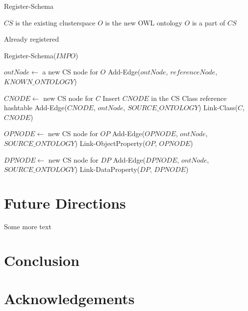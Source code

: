 \documentclass{sig-alternate}
\begin{document}
    \begin{algorithm}
        \caption{Register-Schema}
        \label{csf}
        \begin{algorithmic}
            \REQUIRE $CS$ is the existing clusterspace
            \REQUIRE $O$ is the new OWL ontology
            \ENSURE $O$ is a part of $CS$

                \RETURN Already registered
            \ENDIF

                \STATE Register-Schema($IMPO$)
            \ENDFOR

            \STATE $ontNode \leftarrow$ a new CS node for $O$
            \STATE Add-Edge($ontNode$, $referenceNode$, $KNOWN\_ONTOLOGY$)

                \STATE $CNODE \leftarrow$ new CS node for $C$
                \STATE Insert $CNODE$ in the CS Class reference hashtable
                \STATE Add-Edge($CNODE$, $ontNode$, $SOURCE\_ONTOLOGY$)
                \STATE Link-Class($C$, $CNODE$)
            \ENDFOR

                \STATE $OPNODE \leftarrow$ new CS node for $OP$
                \STATE Add-Edge($OPNODE$, $ontNode$, $SOURCE\_ONTOLOGY$)
                \STATE Link-ObjectProperty($OP$, $OPNODE$)
            \ENDFOR

                \STATE $DPNODE \leftarrow$ new CS node for $DP$
                \STATE Add-Edge($DPNODE$, $ontNode$, $SOURCE\_ONTOLOGY$)
                \STATE Link-DataProperty($DP$, $DPNODE$)
            \ENDFOR

        \end{algorithmic}
    \end{algorithm}

    \section{Future Directions}

    Some more text

    \section{Conclusion}

    \section{Acknowledgements}

    
    
\end{document}
